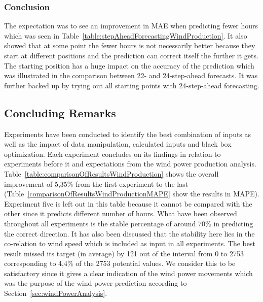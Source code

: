 \subsubsection{Conclusion}
The expectation was to see an improvement in MAE when predicting fewer hours which was seen in Table~\ref{table:stepAheadForecastingWindProduction}. It also showed that at some point the fewer hours is not necessarily better because they start at different positions and the prediction can correct itself the further it gets. The starting position has a huge impact on the accuracy of the prediction which was illustrated in the comparison between 22- and 24-step-ahead forecasts. It was further backed up by trying out all starting points with 24-step-ahead forecasting.

\subsection{Concluding Remarks}
Experiments have been conducted to identify the best combination of inputs as well as the impact of data manipulation, calculated inputs and black box optimization. Each experiment concludes on its findings in relation to experiments before it and expectations from the wind power production analysis. Table~\ref{table:comparisonOfResultsWindProduction} shows the overall improvement of 5,35\% from the first experiment to the last (Table~\ref{comparisonOfResultsWindProductionMAPE} show the results in MAPE). Experiment five is left out in this table because it cannot be compared with the other since it predicts different number of hours. What have been observed throughout all experiments is the stable percentage of around 70\% in predicting the correct direction. It has also been discussed that the stability here lies in the co-relation to wind speed which is included as input in all experiments. The best result missed its target (in average) by 121 out of the interval from 0 to 2753 corresponding to 4,4\% of the 2753 potential values. We consider this to be satisfactory since it gives a clear indication of the wind power movements which was the purpose of the wind power prediction according to Section~\ref{sec:windPowerAnalysis}. 

